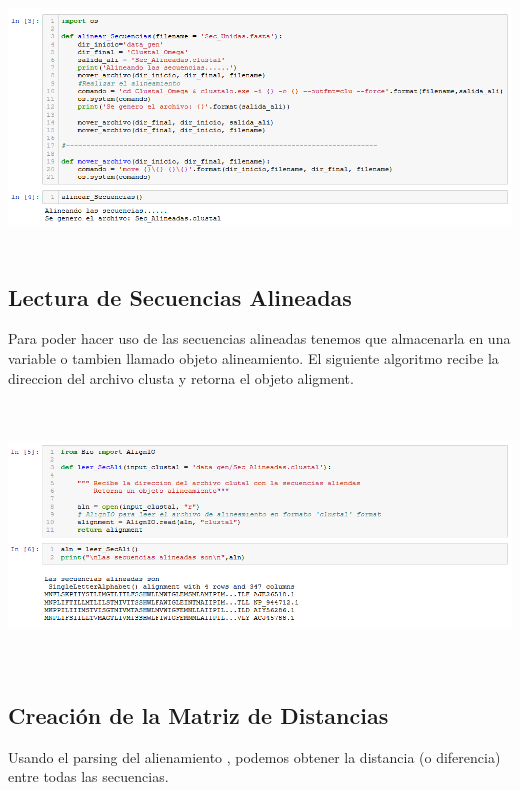 \documentclass[a4paper]{article}
\begin{document}
 
\begin{center}
	\includegraphics[width=16cm,height=7cm]{Alin_Sec.png}
\end{center}

\subsection{Lectura de Secuencias Alineadas}
Para poder hacer uso de las secuencias alineadas tenemos que almacenarla en una variable o tambien llamado objeto alineamiento. El siguiente algoritmo recibe la direccion del archivo clusta y retorna el objeto aligment.

\begin{center}
	\includegraphics[width=16cm,height=7cm]{leerAlin.png}
\end{center}


\subsection{Creación de la Matriz de Distancias}
Usando el parsing del alienamiento , podemos obtener la distancia (o diferencia) entre todas las secuencias.
\end{document}
